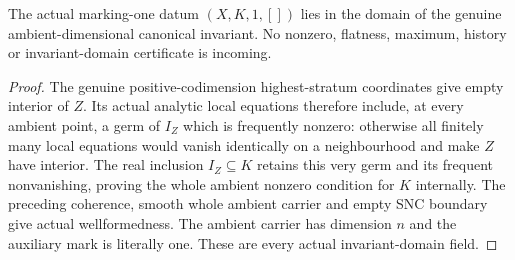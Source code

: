 \begin{theorem}
\label{hir:nc-intrinsic-stratum-detection-domain}
The actual marking-one datum $(X,K,1,[])$ lies in the domain of the genuine
ambient-dimensional canonical invariant. No nonzero, flatness, maximum,
history or invariant-domain certificate is incoming.
\leanok
\end{theorem}
\begin{proof}
The genuine positive-codimension highest-stratum coordinates give empty
interior of $Z$. Its actual analytic local equations therefore include,
at every ambient point, a germ of $I_Z$ which is frequently nonzero:
otherwise all finitely many local equations would vanish identically on a
neighbourhood and make $Z$ have interior. The real inclusion $I_Z\subseteq K$
retains this very germ and its frequent nonvanishing, proving the whole
ambient nonzero condition for $K$ internally. The preceding coherence,
smooth whole ambient carrier and empty SNC boundary give actual
wellformedness. The ambient carrier has dimension $n$ and the auxiliary
mark is literally one. These are every actual invariant-domain field.
\end{proof}

